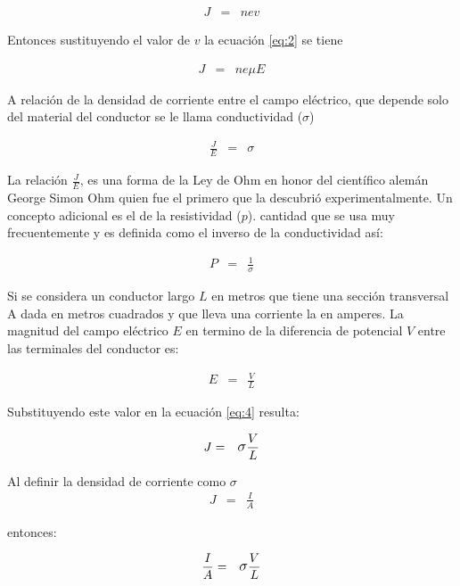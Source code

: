 \documentclass[11pt]{article}
\begin{document}
\begin{multicols}{2}
		\begin{eqnarray}
			J&=& n e v \label{eq:2}
		\end{eqnarray}
		
		Entonces sustituyendo el valor de $v$ la ecuación \ref{eq:2} se tiene 
		
		\begin{eqnarray}
			J &=& n e \mu E \label{eq:3}
		\end{eqnarray} 

		A relación de la densidad de corriente entre el campo eléctrico, que depende solo del material del conductor se le llama conductividad ($\sigma$)
		
		\begin{eqnarray}
			\frac{J}{E}&=& \sigma \label{eq:4}
		\end{eqnarray}

		La relación $\displaystyle\frac{J}{E}$, es una forma de la Ley de Ohm en honor del científico alemán George Simon Ohm quien fue el primero que la descubrió experimentalmente. 
		Un concepto adicional es el de la resistividad ($p$). cantidad que se usa muy frecuentemente y es definida como el inverso de la conductividad así:
		
		\begin{eqnarray}
			P &=& \frac{1}{\sigma} \label{eq:5}
		\end{eqnarray}

		Si se considera un conductor largo $L$ en metros que tiene una sección transversal A dada en metros cuadrados y que lleva una corriente la en amperes.
		La magnitud del campo eléctrico $E$ en termino de la diferencia de potencial $V$ entre las terminales del conductor es:

		\begin{eqnarray}
			E &=& \frac{V}{L} \label{eq:6}
		\end{eqnarray}

		Substituyendo este valor en la ecuación \ref{eq:4} resulta:
		
		\begin{eqnarray}
			J&=& \mathlarger{\sigma} \frac{V}{L} \label{eq:7}
		\end{eqnarray}

		Al definir la densidad de corriente como
		$\sigma$
		\begin{eqnarray}
			J &=& \frac{I}{A} \label{eq:8}
		\end{eqnarray}

		entonces:

		\begin{eqnarray}
			\frac{I}{A} &=& \mathlarger{\sigma} \frac{V}{L} \label{eq:9}
		\end{eqnarray}


\end{multicols}
\end{document}
